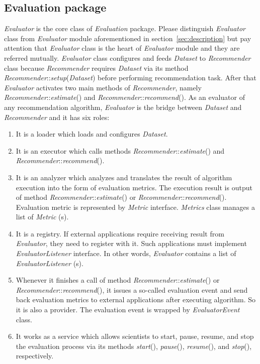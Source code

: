 \documentclass[a4paper,twoside]{article}
\begin{document}
\subsection{Evaluation package}
\label{subsec:evaluation-package}
\textit{Evaluator} is the core class of \textit{Evaluation} package. Please distinguish \textit{Evaluator} class from \textit{Evaluator} module aforementioned in section~\ref{sec:description} but pay attention that \textit{Evaluator} class is the heart of \textit{Evaluator} module and they are referred mutually. \textit{Evaluator} class configures and feeds \textit{Dataset} to \textit{Recommender} class because \textit{Recommender} requires \textit{Dataset} via its method \textit{Recommender}::\textit{setup}(\textit{Dataset}) before performing recommendation task. After that \textit{Evaluator} activates two main methods of \textit{Recommender}, namely \textit{Recommender}::\textit{estimate}() and \textit{Recommender}::\textit{recommend}(). As an evaluator of any recommendation algorithm, \textit{Evaluator} is the bridge between \textit{Dataset} and \textit{Recommender} and it has six roles:
\begin{enumerate}
\item It is a loader which loads and configures \textit{Dataset}.
\item It is an executor which calls methods \textit{Recommender}::\textit{estimate}() and \textit{Recommender}::\textit{recommend}().
\item It is an analyzer which analyzes and translates the result of algorithm execution into the form of evaluation metrics. The execution result is output of method \textit{Recommender}::\textit{estimate}() or \textit{Recommender}::\textit{recommend}(). Evaluation metric is represented by \textit{Metric} interface. \textit{Metrics} class manages a list of \textit{Metric} (s).
\item It is a registry. If external applications require receiving result from \textit{Evaluator}, they need to register with it. Such applications must implement \textit{EvaluatorListener} interface. In other words, \textit{Evaluator} contains a list of \textit{EvaluatorListener} (s).
\item Whenever it finishes a call of method \textit{Recommender}::\textit{estimate}() or \textit{Recommender}::\textit{recommend}(), it issues a so-called evaluation event and send back evaluation metrics to external applications after executing algorithm. So it is also a provider. The evaluation event is wrapped by \textit{EvaluatorEvent} class.
\item It works as a service which allows scientists to start, pause, resume, and stop the evaluation process via its methods \textit{start}(), \textit{pause}(), \textit{resume}(), and \textit{stop}(), respectively.
\end{enumerate}
\end{document}
